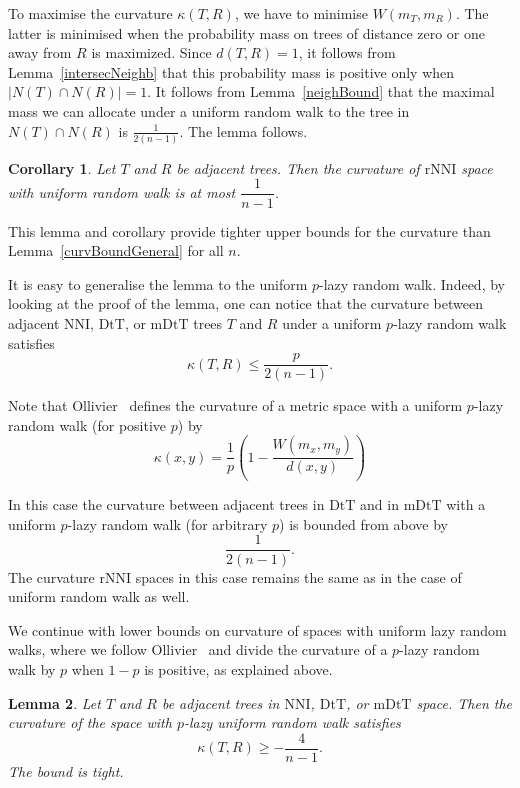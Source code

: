 \documentclass{amsart}
\newtheorem{lemma}{Lemma}
\newtheorem{corollary}[lemma]{Corollary}
\newcommand{\dts}{\mathrm{DtT}}
\newcommand{\nni}{\mathrm{NNI}}
\newcommand{\rnni}{\mathrm{rNNI}}
\newcommand{\mdts}{\mathrm{mDtT}}
\begin{document}
\proof
To maximise the curvature $\kappa(T,R)$, we have to minimise $W(m_T,m_R)$.
The latter is minimised when the probability mass on trees of distance zero or one away from $R$ is maximized.
Since $d(T,R) = 1$, it follows from
Lemma~\ref{intersecNeighb} that this probability mass is positive only
when $|N(T) \cap N(R)| = 1$. It follows from Lemma~\ref{neighBound} that
the maximal mass we can allocate under a uniform random walk to the tree in
$N(T) \cap N(R)$ is $\frac{1}{2(n-1)}$. The lemma follows.
\endproof

\begin{corollary}
Let $T$ and $R$ be adjacent trees.
Then the curvature of $\rnni$ space with uniform random walk is at most $\dfrac{1}{n-1}$.
\end{corollary}

This lemma and corollary provide tighter upper bounds for the curvature than Lemma~\ref{curvBoundGeneral} for all $n$.

It is easy to generalise the lemma to the uniform $p$-lazy random walk.
Indeed, by looking at the proof of the lemma, one can notice that the curvature between adjacent $\nni$, $\dts$, or $\mdts$ trees $T$ and $R$ under a uniform $p$-lazy random walk satisfies
\[
\kappa(T,R) \leq \frac{p}{2(n-1)}.
\]

Note that Ollivier~\cite{Ollivier2009-cj} defines the curvature of a metric
space with a uniform $p$-lazy random walk (for positive $p$) by
\[
\kappa(x,y) = \frac1p (1 - \frac{W(m_x, m_y)}{d(x, y)})
\]

In this case the curvature between adjacent trees in $\dts$ and in $\mdts$ with a uniform $p$-lazy random walk (for arbitrary $p$) is bounded from above by
\[
\frac{1}{2(n-1)}.
\]
The curvature $\rnni$ spaces in this case remains the same as in the case of uniform random walk as well.

We continue with lower bounds on curvature of spaces with uniform lazy random walks, where we follow Ollivier~\cite{Ollivier2009-cj} and divide the curvature of a $p$-lazy random walk by $p$ when $1-p$ is positive, as explained above.

\begin{lemma}\label{uniformLower}
Let $T$ and $R$ be adjacent trees in $\nni$, $\dts$, or $\mdts$ space.
Then the curvature of the space with $p$-lazy uniform random walk satisfies
\[
\kappa(T,R) \geq -\frac{4}{n-1}.
\]
The bound is tight.
\end{lemma}
\end{document}
